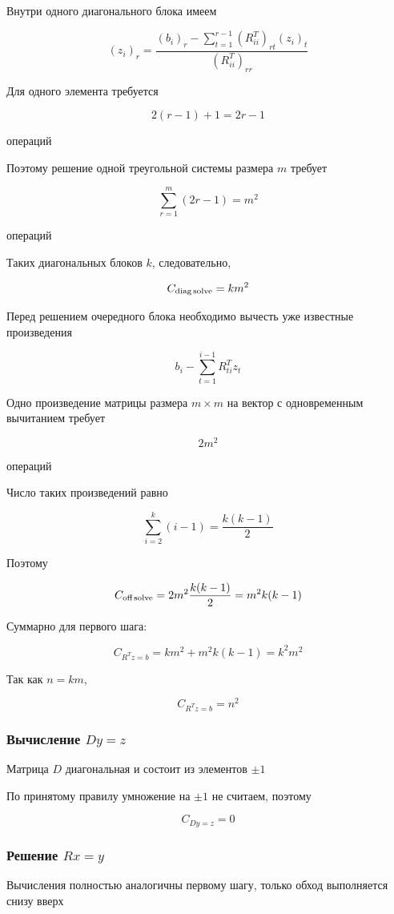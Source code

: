 \documentclass[a4paper,12pt]{article}
\begin{document}
Внутри одного диагонального блока имеем

$$
(z_i)_r
=
\frac{
  (b_i)_r
  -
  \sum_{t=1}^{r-1}
  (R_{ii}^T)_{rt}(z_i)_t
}{
  (R_{ii}^T)_{rr}
}
$$

Для одного элемента требуется

$$
2(r-1)+1=2r-1
$$

операций

Поэтому решение одной треугольной системы размера \(m\) требует

$$
\sum_{r=1}^{m}(2r-1)=m^2
$$

операций

Таких диагональных блоков \(k\), следовательно,

$$
C_{\text{diag\,solve}}=km^2
$$

Перед решением очередного блока необходимо вычесть уже известные произведения

$$
b_i
-
\sum_{t=1}^{i-1}R_{ti}^{T}z_t
$$

Одно произведение матрицы размера \(m\times m\) на вектор с одновременным вычитанием требует

$$
2m^2
$$

операций

Число таких произведений равно

$$
\sum_{i=2}^{k}(i-1)
=
\frac{k(k-1)}2
$$

Поэтому

$$
C_{\text{off\,solve}}
=
2m^2\frac{k(k-1)}2
=
m^2k(k-1)
$$

Суммарно для первого шага:

$$
C_{R^Tz=b}
=
km^2+m^2k(k-1)
=
k^2m^2
$$

Так как \(n=km\),

$$
C_{R^Tz=b}=n^2
$$

\subsubsection{Вычисление \(Dy=z\)}

Матрица \(D\) диагональная и состоит из элементов \(\pm1\)

По принятому правилу умножение на \(\pm1\) не считаем, поэтому

$$
C_{Dy=z}=0
$$

\subsubsection{Решение \(Rx=y\)}

Вычисления полностью аналогичны первому шагу, только обход выполняется снизу вверх
\end{document}

